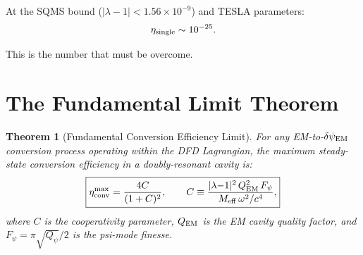 \documentclass[11pt]{article}
\newtheorem{theorem}{Theorem}
\newcommand{\ee}[1]{\times 10^{#1}}
\newcommand{\dpsiEM}{\delta\psi_{\rm EM}}
\newcommand{\Meff}{M_{\rm eff}}
\newcommand{\lambdaone}{|\lambda{-}1|}
\newcommand{\Qpsi}{Q_\psi}
\newcommand{\QEM}{Q_{\rm EM}}
\newcommand{\Fpsi}{F_\psi}
\begin{document}
At the SQMS bound ($\lambdaone < 1.56\ee{-9}$) and TESLA parameters:
\begin{equation}
\eta_{\rm single} \sim 10^{-25}.
\label{eq:eta-single-number}
\end{equation}

This is the number that must be overcome.

\section{The Fundamental Limit Theorem}
\label{sec:fundamental-limit}

\begin{theorem}[Fundamental Conversion Efficiency Limit]
\label{thm:fundamental}
For any EM-to-$\dpsiEM$ conversion process operating within the DFD
Lagrangian, the maximum steady-state conversion efficiency in a
doubly-resonant cavity is:
\begin{equation}
\boxed{
\eta_{\rm conv}^{\rm max} = \frac{4C}{(1+C)^2},
\qquad C \equiv \frac{\lambdaone^2\,\QEM^2\,\Fpsi}{\Meff\,\omega^2/c^4},
}
\label{eq:fundamental-limit}
\end{equation}
where $C$ is the cooperativity parameter, $\QEM$ is the EM cavity
quality factor, and $\Fpsi = \pi\sqrt{\Qpsi}/2$ is the psi-mode
finesse.
\end{theorem}
\end{document}
